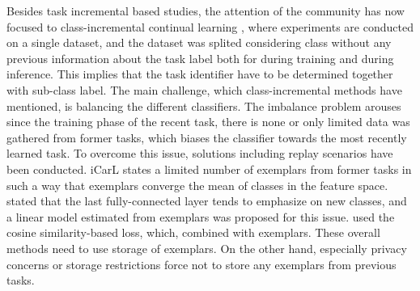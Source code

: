 \documentclass{article}
\begin{document}
Besides task incremental based studies, the attention of the community has now focused to class-incremental continual learning \cite{kueffner2023into}, where experiments are conducted on a single dataset, and the dataset was splited considering class without any previous information about the task label both for during training and during inference. This implies that the task identifier have to be determined together with sub-class label. The main challenge, which class-incremental methods have
mentioned, is balancing the different classifiers. The
imbalance problem arouses since the training phase of the
recent task, there is none or only limited data was gathered
from former tasks, which biases the classifier towards the
most recently learned task\cite{liu2020generative}. To overcome this issue, solutions including replay scenarios have been conducted. iCarL \cite{rebuffi2017icarl} states a limited number of exemplars from former tasks in such a way that exemplars converge the mean of classes in the feature space. \cite{wu2019large}
stated that the last fully-connected layer tends to emphasize on new classes, and  a linear model estimated from exemplars was proposed for this issue. \cite{hou2019learning} used the cosine similarity-based loss, which, combined with exemplars. These overall methods need to use storage of exemplars. On the other hand, especially privacy concerns or storage restrictions force not to store any exemplars from previous tasks.
\end{document}
